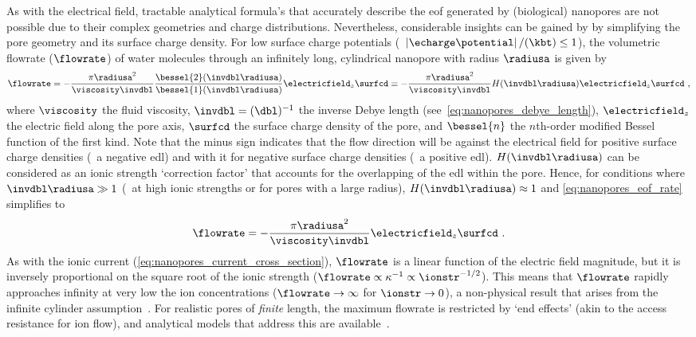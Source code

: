 As with the electrical field, tractable analytical formula's that accurately describe the \gls{eof} generated
by (biological) nanopores are not possible due to their complex geometries and charge distributions.
Nevertheless, considerable insights can be gained by by simplifying the pore geometry and its surface charge
density. For low surface charge potentials (\ie~$\left| \echarge \potential\right| / (\kbt) \le 1$), the
volumetric flowrate ($\flowrate$) of water molecules through an infinitely long, cylindrical nanopore with
radius $\radiusa$ is given by~\cite{Laohakunakorn-2015}
%
\begin{equation}\label{eq:nanopores_eof_rate}
  \flowrate = - \dfrac{\pi \radiusa^2}{\viscosity \invdbl} 
  \dfrac{ \bessel{2} ( \invdbl \radiusa ) }{ \bessel{1} (\invdbl \radiusa) }
  \electricfield_z \surfcd
  \equiv - \dfrac{\pi \radiusa^2}{\viscosity \invdbl} H(\invdbl \radiusa) \electricfield_z \surfcd
  \text{ ,}
\end{equation}
%
where $\viscosity$ the fluid viscosity, $\invdbl = (\dbl)^{-1}$ the inverse Debye length
(see~\cref{eq:nanopores_debye_length}), $\electricfield_z$ the electric field along the pore axis, $\surfcd$
the surface charge density of the pore, and $\bessel{n}$ the $n$th-order modified Bessel function of the first
kind. Note that the minus sign indicates that the flow direction will be against the electrical field for
positive surface charge densities (\ie~a negative \gls{edl}) and with it for negative surface charge densities
(\ie~a positive \gls{edl}). $H(\invdbl \radiusa)$ can be considered as an ionic strength `correction factor'
that accounts for the overlapping of the \gls{edl} within the pore. Hence, for conditions where $\invdbl
\radiusa \gg 1$ (\eg~at high ionic strengths or for pores with a large radius), $H(\invdbl \radiusa) \approx
1$ and \cref{eq:nanopores_eof_rate} simplifies to
%
\begin{equation}\label{eq:nanopores_eof_rate_simple}
  \flowrate = - \dfrac{\pi \radiusa^2}{\viscosity \invdbl} \electricfield_z \surfcd
  \text{ .}
\end{equation}
%
As with the ionic current (\cref{eq:nanopores_current_cross_section}), $\flowrate$ is a linear function of the
electric field magnitude, but it is inversely proportional on the square root of the ionic strength
($\flowrate \propto \kappa^{-1} \propto \ionstr^{-1/2}$). This means that $\flowrate$ rapidly approaches
infinity at very low the ion concentrations  ($\flowrate \to \infty$ for $\ionstr \to 0$), a non-physical
result that arises from the infinite cylinder assumption~\cite{Mao-2014}. For realistic pores of \emph{finite}
length, the maximum flowrate is restricted by `end effects' (akin to the access resistance for ion flow), and
analytical models that address this are available~\cite{Sherwood-2014}.

